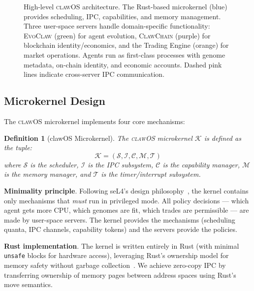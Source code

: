\documentclass{article}
\newtheorem{definition}{Definition}
\newcommand{\clawos}{\textsc{clawOS}}
\newcommand{\evoclaw}{\textsc{EvoClaw}}
\newcommand{\clawchain}{\textsc{ClawChain}}
\begin{document}
\begin{figure}[t]
\caption{High-level \clawos{} architecture. The Rust-based microkernel (blue) provides scheduling, IPC, capabilities, and memory management. Three user-space servers handle domain-specific functionality: \evoclaw{} (green) for agent evolution, \clawchain{} (purple) for blockchain identity/economics, and the Trading Engine (orange) for market operations. Agents run as first-class processes with genome metadata, on-chain identity, and economic accounts. Dashed pink lines indicate cross-server IPC communication.}
\label{fig:architecture}
\end{figure}

\subsection{Microkernel Design}
\label{subsec:microkernel}

The \clawos{} microkernel implements four core mechanisms:

\begin{definition}[clawOS Microkernel]
The \clawos{} microkernel $\mathcal{K}$ is defined as the tuple:
$$\mathcal{K} = (\mathcal{S}, \mathcal{I}, \mathcal{C}, \mathcal{M}, \mathcal{T})$$
where $\mathcal{S}$ is the scheduler, $\mathcal{I}$ is the IPC subsystem, $\mathcal{C}$ is the capability manager, $\mathcal{M}$ is the memory manager, and $\mathcal{T}$ is the timer/interrupt subsystem.
\end{definition}

\textbf{Minimality principle}. Following seL4's design philosophy~\cite{klein2009sel4}, the kernel contains only mechanisms that \emph{must} run in privileged mode. All policy decisions — which agent gets more CPU, which genomes are fit, which trades are permissible — are made by user-space servers. The kernel provides the mechanisms (scheduling quanta, IPC channels, capability tokens) and the servers provide the policies.

\textbf{Rust implementation}. The kernel is written entirely in Rust (with minimal \texttt{unsafe} blocks for hardware access), leveraging Rust's ownership model for memory safety without garbage collection~\cite{narayanan2020redleaf, boos2020theseus}. We achieve zero-copy IPC by transferring ownership of memory pages between address spaces using Rust's move semantics.
\end{document}
